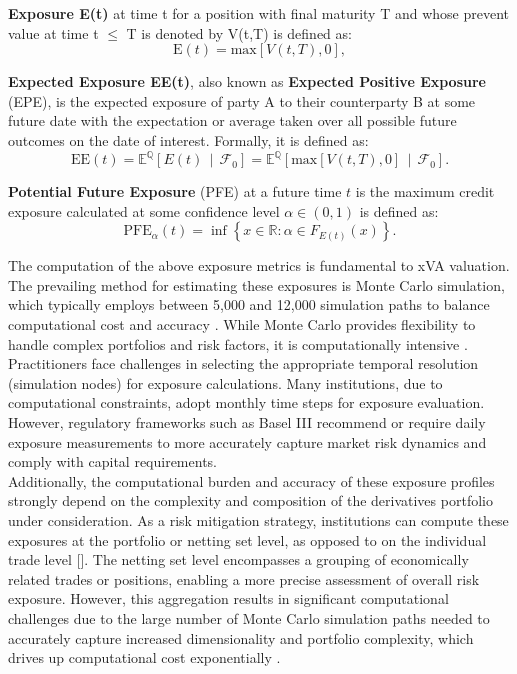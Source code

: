     \begin{definition}
    \label{def:exposure}
    \textbf{Exposure E(t)} at time t for a position with final maturity T and whose prevent value at time t $\leq$ T is denoted by V(t,T) is defined as:
     \[
    \text{E}(t) = \text{max}[V(t, T),0],
    \]
    \end{definition}
    
    \begin{definition}
    \label{def:expected_exposure}
    \textbf{Expected Exposure EE(t)}, also known as \textbf{Expected Positive Exposure} (EPE), is the expected exposure of party A to their counterparty B at some future date with the expectation or average taken over all possible future outcomes on the date of interest. Formally, it is defined as:
    \[
    \text{EE}(t) = \mathbb{E}^{\mathbb{Q}} \left[ E(t) \, \middle| \, \mathscr{F}_0 \right] = \mathbb{E}^{\mathbb{Q}} \left[ \text{max}[V(t, T),0]\, \middle| \, \mathscr{F}_0 \right].
    \]
    \end{definition}
    
    \begin{definition}
    \label{def:pfe}
    \textbf{Potential Future Exposure} (PFE) at a future time \( t \) 
    is the maximum credit exposure calculated at some confidence level  \( \alpha \in (0,1) \) is defined as:
    \[
    \text{PFE}_{\alpha}(t) = \inf \left\{ x \in \mathbb{R} : \alpha \in F_{E(t)}(x) \right\}.
    \]
    \end{definition}
\noindent
    The computation of the above exposure metrics is fundamental to xVA valuation. The prevailing method for estimating these exposures is Monte Carlo simulation, which typically employs between 5,000 and 12,000 simulation paths to balance computational cost and accuracy \cite{frode2022neural}. While Monte Carlo provides flexibility to handle complex portfolios and risk factors, it is computationally intensive \cite{Gregory_2015}. Practitioners face challenges in selecting the appropriate temporal resolution (simulation nodes) for exposure calculations. Many institutions, due to computational constraints, adopt monthly time steps for exposure evaluation. However, regulatory frameworks such as Basel III recommend or require daily exposure measurements to more accurately capture market risk dynamics and comply with capital requirements. \\
    

\noindent
    Additionally, the computational burden and accuracy of these exposure profiles strongly depend on the complexity and composition of the derivatives portfolio under consideration\cite{belkotain2018x}.
    As a risk mitigation strategy, institutions can compute these exposures at the portfolio or netting set level, as opposed to on the individual trade level [\cite{Tsuchiya_2019}]. The netting set level encompasses a grouping of economically related trades or positions, enabling a more precise assessment of overall risk exposure. However, this aggregation results in significant computational challenges due to the large number of Monte Carlo simulation paths needed to accurately capture increased dimensionality and portfolio complexity, which drives up computational cost exponentially \cite{gnoatto2022deep}. \\

